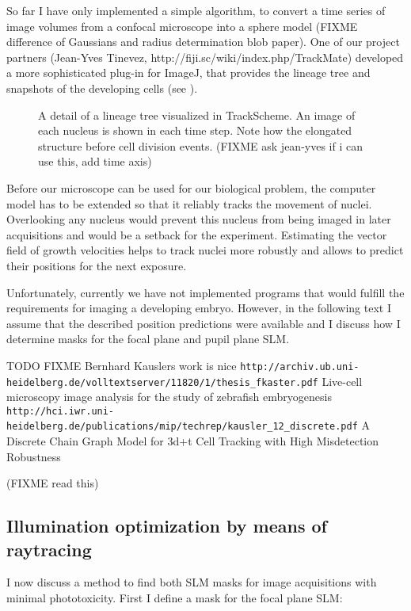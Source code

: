 So far I have only implemented a simple algorithm, to convert a time
series of image volumes from a confocal microscope into a sphere model
(FIXME difference of Gaussians and radius determination blob paper).
One of our project partners (Jean-Yves Tinevez,
http://fiji.sc/wiki/index.php/TrackMate) developed a more
sophisticated plug-in for ImageJ, that provides the lineage tree and
snapshots of the developing cells (see ).
\begin{figure}[!hbt] \centering
{}
  \caption{ A detail of a lineage tree visualized in TrackScheme. An
image of each nucleus is shown in each time step. Note how the
elongated structure before cell division events. (FIXME ask jean-yves
if i can use this, add time axis)}
  \label{fig:trackmate}
\end{figure} Before our microscope can be used for our biological
problem, the computer model has to be extended so that it reliably
tracks the movement of nuclei.  Overlooking any nucleus would prevent
this nucleus from being imaged in later acquisitions and would be a
setback for the experiment.  Estimating the vector field of growth
velocities helps to track nuclei more robustly and allows to predict
their positions for the next exposure.

Unfortunately, currently we have not implemented programs that would
fulfill the requirements for imaging a developing embryo.  However, in
the following text I assume that the described position predictions
were available and I discuss how I determine masks for the focal plane
and pupil plane SLM.

\cite{Murray2006}

TODO FIXME Bernhard Kauslers work is nice
\verb!http://archiv.ub.uni-heidelberg.de/volltextserver/11820/1/thesis_fkaster.pdf!
Live-cell microscopy image analysis for the study of zebrafish embryogenesis
\verb!http://hci.iwr.uni-heidelberg.de/publications/mip/techrep/kausler_12_discrete.pdf!
A Discrete Chain Graph Model for
  3d+t Cell Tracking with High
    Misdetection Robustness

(FIXME read this)


\subsection{Illumination optimization by means of raytracing} 
I now discuss a method to find both SLM masks for image acquisitions
with minimal phototoxicity. First I define a mask for the focal plane
SLM:


